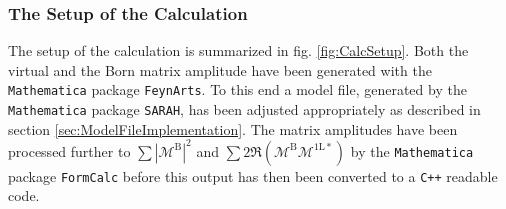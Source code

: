 \subsubsection{The Setup of the Calculation}
The setup of the calculation is summarized in fig. \ref{fig:CalcSetup}. Both the virtual and the Born matrix amplitude have been generated with the \texttt{Mathematica} package \texttt{FeynArts}. To this end a model file, generated by the \texttt{Mathematica} package \texttt{SARAH}, has been adjusted appropriately as described in section \ref{sec:ModelFileImplementation}. The matrix amplitudes have been processed further to $\sum|\mathcal{M}^{\mathrm{B}}|^2$ and $ \sum 2\Re (\mathcal{M}^{\mathrm{B}} \mathcal{M}^{\mathrm{1L}\ast})$ by the \texttt{Mathematica} package \texttt{FormCalc} before this output has then been converted to a \texttt{C++} readable code.
